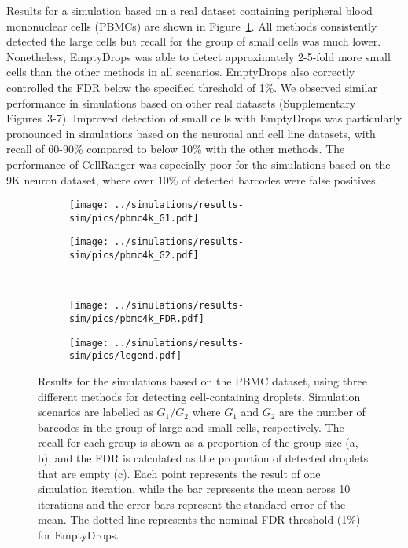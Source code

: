 \documentclass[10pt,letterpaper]{article}
\newcommand{\suppfigsimresults}{3-7}
\begin{document}
Results for a simulation based on a real dataset containing peripheral blood mononuclear cells (PBMCs) are shown in Figure~\ref{fig:simpbmc}.
All methods consistently detected the large cells but recall for the group of small cells was much lower.
Nonetheless, EmptyDrops was able to detect approximately 2-5-fold more small cells than the other methods in all scenarios.
EmptyDrops also correctly controlled the FDR below the specified threshold of 1\%.
We observed similar performance in simulations based on other real datasets (Supplementary Figures~\suppfigsimresults{}).
Improved detection of small cells with EmptyDrops was particularly pronounced in simulations based on the neuronal and cell line datasets,
with recall of 60-90\% compared to below 10\% with the other methods.
The performance of CellRanger was especially poor for the simulations based on the 9K neuron dataset, where over 10\% of detected barcodes were false positives.

\begin{figure}[btp]
    \begin{center}
        \begin{subfigure}{0.49\textwidth}
        \texttt{[image: ../simulations/results-sim/pics/pbmc4k\_G1.pdf]}
        \caption{}
        \end{subfigure}
        \begin{subfigure}{0.49\textwidth}
        \texttt{[image: ../simulations/results-sim/pics/pbmc4k\_G2.pdf]}
        \caption{}
    \end{subfigure} \\[0.1in]
        \begin{subfigure}{0.49\textwidth}
        \texttt{[image: ../simulations/results-sim/pics/pbmc4k\_FDR.pdf]}
        \caption{}
        \end{subfigure}
        \begin{subfigure}{0.49\textwidth}
        \texttt{[image: ../simulations/results-sim/pics/legend.pdf]}
        \end{subfigure}
    \end{center}
\caption{Results for the simulations based on the PBMC dataset, using three different methods for detecting cell-containing droplets.    
Simulation scenarios are labelled as $G_1/G_2$ where $G_1$ and $G_2$ are the number of barcodes in the group of large and small cells, respectively.
The recall for each group is shown as a proportion of the group size (a, b), and the FDR is calculated as the proportion of detected droplets that are empty (c).
Each point represents the result of one simulation iteration, while the bar represents the mean across 10 iterations and the error bars represent the standard error of the mean.
The dotted line represents the nominal FDR threshold (1\%) for EmptyDrops.
}
\label{fig:simpbmc}
\end{figure}
\end{document}
